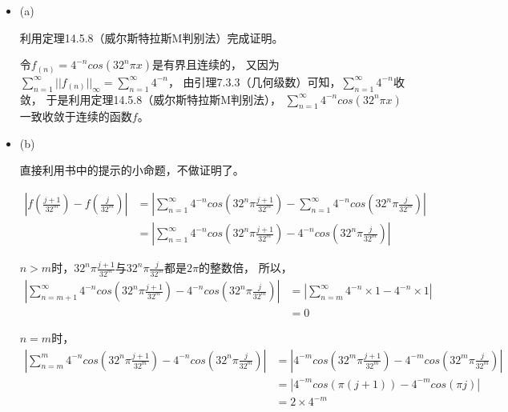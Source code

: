 \documentclass{article}
\begin{document}
\begin{itemize}
  \item (a)

        利用定理14.5.8（威尔斯特拉斯M判别法）完成证明。

        令$f_(n) = 4^{-n} cos(32^n \pi x)$是有界且连续的，
        又因为$\sum \limits_{n = 1}^{\infty} ||f_(n)||_{\infty} = \sum \limits_{n = 1}^{\infty} 4^{-n}$，
        由引理7.3.3（几何级数）可知，$\sum \limits_{n = 1}^{\infty} 4^{-n}$收敛，
        于是利用定理14.5.8（威尔斯特拉斯M判别法），
        $\sum \limits_{n = 1}^{\infty} 4^{-n} cos(32^n \pi x)$
        一致收敛于连续的函数$f$。
  \item (b)

        直接利用书中的提示的小命题，不做证明了。

        \begin{align*}
          \left|f(\frac{j + 1}{32^m}) - f(\frac{j}{32^m})\right|
           & = \left|\sum\limits_{n = 1}^{\infty} 4^{-n} cos(32^n \pi \frac{j + 1}{32^m}) - \sum\limits_{n = 1}^{\infty} 4^{-n} cos(32^n \pi \frac{j}{32^m}) \right| \\
           & =  \left|\sum\limits_{n = 1}^{\infty} 4^{-n} cos(32^n \pi \frac{j + 1}{32^m}) - 4^{-n} cos(32^n \pi \frac{j}{32^m}) \right|
        \end{align*}

        $n > m$时，$32^n \pi \frac{j + 1}{32^m}$与$32^n \pi \frac{j}{32^m}$都是$2\pi$的整数倍，
        所以，
        \begin{align*}
          \left|\sum\limits_{n = m+1}^{\infty} 4^{-n} cos(32^n \pi \frac{j + 1}{32^m}) - 4^{-n} cos(32^n \pi \frac{j}{32^m}) \right|
           & = \left|\sum\limits_{n = m}^{\infty} 4^{-n} \times 1  - 4^{-n} \times 1  \right| \\
           & = 0
        \end{align*}

        $n = m$时，
        \begin{align*}
          \left|\sum\limits_{n = m}^{m} 4^{-n} cos(32^n \pi \frac{j + 1}{32^m}) - 4^{-n} cos(32^n \pi \frac{j}{32^m}) \right|
           & = \left|4^{-m} cos(32^m \pi \frac{j + 1}{32^m}) - 4^{-m} cos(32^m \pi \frac{j}{32^m}) \right| \\
           & = \left|4^{-m} cos(\pi (j + 1)) - 4^{-m} cos(\pi j) \right|                                   \\
           & = 2 \times 4^{-m}
        \end{align*}


\end{itemize}
\end{document}
